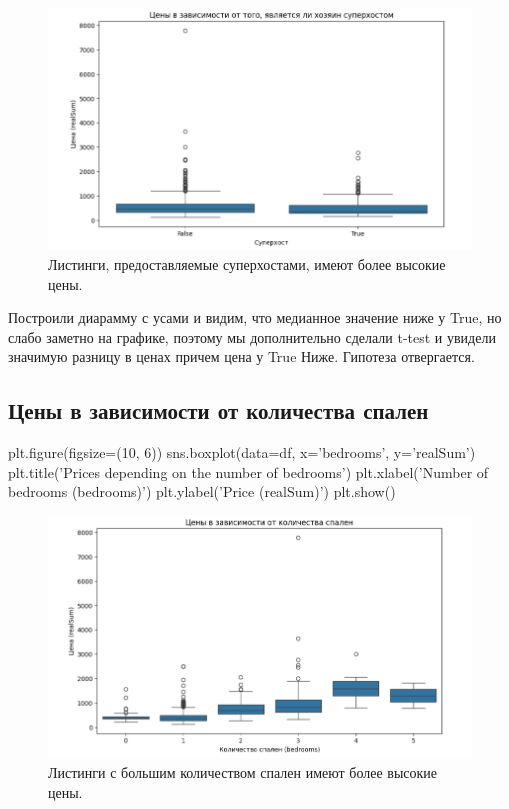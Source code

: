 \documentclass[
	11pt
] {article}
\begin{document}
	\begin{figure}[H]
		\centering
		\includegraphics[width=1.0\textwidth]{fig-03}
		\caption{Листинги, предоставляемые суперхостами, имеют более высокие цены.}
	\end{figure}
	Построили диарамму с усами и видим, что медианное значение ниже у True, но слабо заметно на графике, поэтому мы дополнительно сделали t-test и увидели значимую разницу в ценах причем цена у True Ниже. Гипотеза отвергается.

\subsection{Цены в зависимости от количества спален}
\begin{python}
plt.figure(figsize=(10, 6))
sns.boxplot(data=df, x='bedrooms', y='realSum')
plt.title('Prices depending on the number of bedrooms')
plt.xlabel('Number of bedrooms (bedrooms)')
plt.ylabel('Price (realSum)')
plt.show()
\end{python}

	\begin{figure}[H]
		\centering
		\includegraphics[width=1.0\textwidth]{fig-04}
		\caption{Листинги с большим количеством спален имеют более высокие цены.}
	\end{figure}
\end{document}
